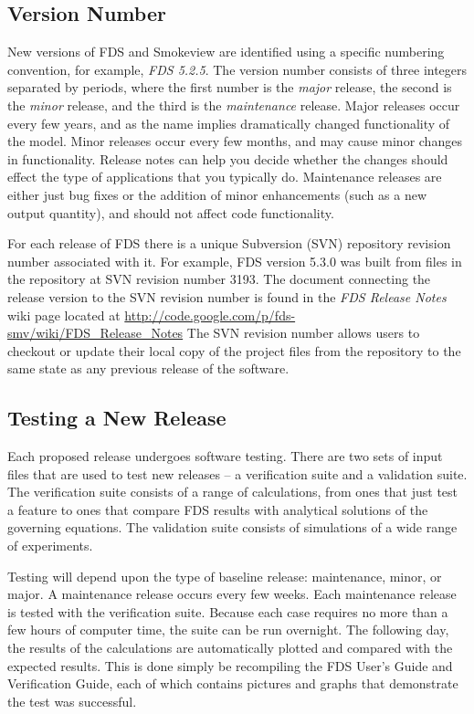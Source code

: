 \documentclass[11pt]{book}
\begin{document}
\subsection{Version Number}

New versions of FDS and Smokeview are identified using a specific numbering convention, for example, {\em FDS 5.2.5}.
The version number consists of three integers separated by periods, where the first number
is the {\em major} release, the second is the {\em minor} release, and the third is the {\em maintenance}
release.  Major releases occur every few years, and as the name implies dramatically changed functionality of the
model. Minor releases occur every few months, and may cause minor changes in functionality.
Release notes can help you decide whether the changes should effect the type of applications that you typically do.
Maintenance releases are either just bug fixes or the addition of minor enhancements (such as a new output quantity),
and should not affect code functionality.

For each release of FDS there is a unique Subversion (SVN) repository revision number associated with it.
For example, FDS version 5.3.0 was built from files in the repository at SVN revision number 3193.
The document connecting the release version to the SVN revision number is found in the {\em FDS Release Notes} wiki page
located at \href{http://code.google.com/p/fds-smv/wiki/FDS_Release_Notes}{{\ct http://code.google.com/p/fds-smv/wiki/FDS\_Release\_Notes}}
The SVN revision number allows users to checkout or update their local copy of the project files from the repository to the same state as any previous release of the software.

\subsection{Testing a New Release}

Each proposed release undergoes software testing.  There are two sets of input files that are used to test new releases --
a verification suite and a validation suite. The verification suite consists of a range of calculations, from ones that just test a feature to
ones that compare FDS results with analytical solutions of the governing equations. The validation suite consists of simulations of a wide range
of experiments.

Testing will depend upon the type of baseline release:
maintenance, minor, or major. A maintenance release occurs every few weeks.
Each maintenance release is tested with the verification suite. Because each case requires no more than a few
hours of computer time, the suite can be run overnight. The following day, the results of the calculations are automatically plotted and
compared with the expected results. This is done simply be recompiling the FDS User's Guide and Verification Guide, each of which contains pictures
and graphs that demonstrate the test was successful.
\end{document}
